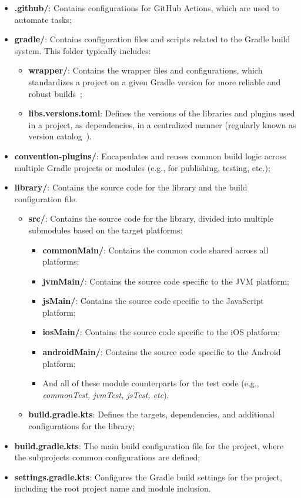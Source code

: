 \begin{itemize}
    \item \textbf{.github/}: Contains configurations for GitHub Actions, which are used to automate tasks;
    \item \textbf{gradle/}: Contains configuration files and scripts related to the Gradle build system.
    This folder typically includes:
    \begin{itemize}
        \item \textbf{wrapper/}: Contains the wrapper files and configurations, which standardizes a project on a given Gradle version for more reliable and robust builds~\cite{gradle-wrapper};
        \item \textbf{libs.versions.toml}: Defines the versions of the libraries and plugins used in a project, as dependencies, in a centralized manner (regularly known as version catalog~\cite{gradle-version-catalog}).
    \end{itemize}
    \item \textbf{convention-plugins/}: Encapsulates and reuses common build logic across multiple Gradle projects or modules (e.g., for publishing, testing, etc.);
    \item \textbf{library/}: Contains the source code for the library and the build configuration file.
    \begin{itemize}
        \item \textbf{src/}: Contains the source code for the library, divided into multiple submodules based on the target platforms:
        \begin{itemize}
            \item \textbf{commonMain/}: Contains the common code shared across all platforms;
            \item \textbf{jvmMain/}: Contains the source code specific to the JVM platform;
            \item \textbf{jsMain/}: Contains the source code specific to the JavaScript platform;
            \item \textbf{iosMain/}: Contains the source code specific to the iOS platform;
            \item \textbf{androidMain/}: Contains the source code specific to the Android platform;
            \item And all of these module counterparts for the test code (e.g., \textit{commonTest, jvmTest, jsTest, etc}).
        \end{itemize}
        \item \textbf{build.gradle.kts}: Defines the targets, dependencies, and additional configurations for the library;
    \end{itemize}
    \item \textbf{build.gradle.kts}: The main build configuration file for the project, where the subprojects common configurations are defined;
    \item \textbf{settings.gradle.kts}: Configures the Gradle build settings for the project, including the root project name and module inclusion.
\end{itemize}

